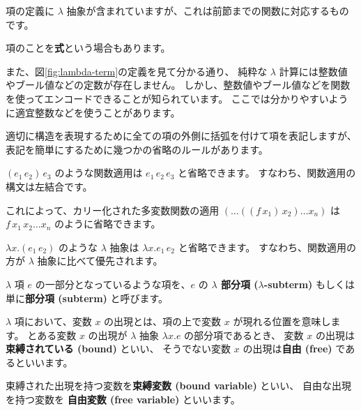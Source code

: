 項の定義に $\lambda$ 抽象が含まれていますが、これは前節までの関数に対応するものです。

項のことを\textbf{式}という場合もあります。

また、図\ref{fig:lambda-term}の定義を見て分かる通り、
純粋な $\lambda$ 計算には整数値やブール値などの定数が存在しません。
しかし、整数値やブール値などを関数を使ってエンコードできることが知られています。
ここでは分かりやすいように適宜整数などを使うことがあります。

適切に構造を表現するために全ての項の外側に括弧を付けて項を表記しますが、
表記を簡単にするために幾つかの省略のルールがあります。

$(e_1 \, e_2) \, e_3$ のような関数適用は $e_1 \, e_2 \, e_3$ と省略できます。
すなわち、関数適用の構文は左結合です。

これによって、カリー化された多変数関数の適用 $(\dots((f \, x_1) \, x_2) \dots x_n)$
は $f \, x_1 \, x_2 \dots x_n$ のように省略できます。

$\lambda x. (e_1 \, e_2)$ のような $\lambda$ 抽象は $\lambda x. e_1 \, e_2$ と省略できます。
すなわち、関数適用の方が $\lambda$ 抽象に比べて優先されます。

$\lambda$ 項 $e$ の一部分となっているような項を、$e$ の
\textbf{$\lambda$ 部分項 ($\lambda$-subterm)} もしくは単に\textbf{部分項 (subterm)} と呼びます。

$\lambda$ 項において、変数 $x$ の出現とは、項の上で変数 $x$ が現れる位置を意味します。
とある変数 $x$ の出現が $\lambda$ 抽象 $\lambda x . e$ の部分項であるとき、
変数 $x$ の出現は\textbf{束縛されている (bound)} といい、
そうでない変数 $x$ の出現は\textbf{自由 (free)} であるといいます。

束縛された出現を持つ変数を\textbf{束縛変数 (bound variable)} といい、
自由な出現を持つ変数を \textbf{自由変数 (free variable)} といいます。

